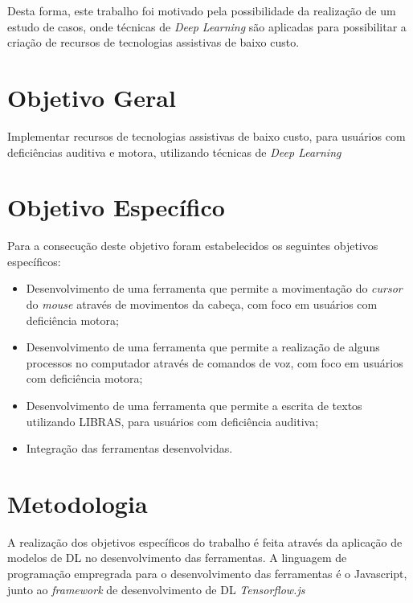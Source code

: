 \par Desta forma, este trabalho foi motivado pela possibilidade da realização de um estudo de casos, onde técnicas de \textit{Deep Learning} são aplicadas para possibilitar a criação de recursos de tecnologias assistivas de baixo custo.

\section{Objetivo Geral} %

\par Implementar recursos de tecnologias assistivas de baixo custo, para usuários com deficiências auditiva e motora, utilizando técnicas de \textit{Deep Learning}

\section{Objetivo Espec\'ifico}

\par Para a consecução deste objetivo foram estabelecidos os seguintes objetivos específicos:

\begin{itemize}
    \item Desenvolvimento de uma ferramenta que permite a movimentação do \textit{cursor} do \textit{mouse} através de movimentos da cabeça, com foco em usuários com deficiência motora;
    \item Desenvolvimento de uma ferramenta que permite a realização de alguns processos no computador através de comandos de voz, com foco em usuários com deficiência motora;
    \item Desenvolvimento de uma ferramenta que permite a escrita de textos utilizando LIBRAS, para usuários com deficiência auditiva;
    \item Integração das ferramentas desenvolvidas.
\end{itemize}

\section{Metodologia} %

A realização dos objetivos específicos do trabalho é feita através da aplicação de modelos de DL no desenvolvimento das ferramentas. A linguagem de programação empregrada para o desenvolvimento das ferramentas é o Javascript, junto ao \textit{framework} de desenvolvimento de DL \textit{Tensorflow.js}

